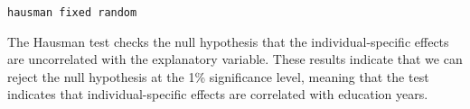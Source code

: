 
\newpage


\begin{verbatim}
hausman fixed random
\end{verbatim}


The Hausman test checks the null hypothesis that the individual-specific effects are uncorrelated with the explanatory variable. These results indicate that we can reject the null hypothesis at the 1\% significance level, meaning that the test indicates that individual-specific effects are correlated with education years.